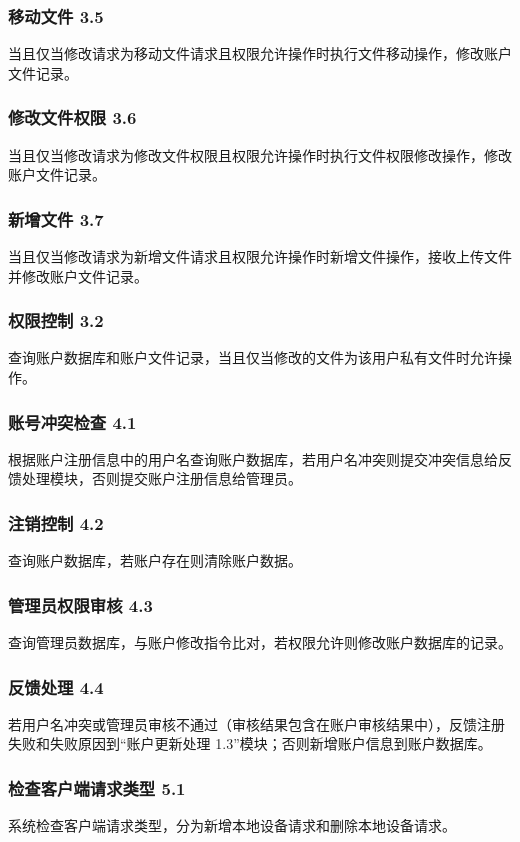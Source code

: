 \subsubsection{移动文件 3.5}
当且仅当修改请求为移动文件请求且权限允许操作时执行文件移动操作，修改账户文件记录。

\subsubsection{修改文件权限 3.6}
当且仅当修改请求为修改文件权限且权限允许操作时执行文件权限修改操作，修改账户文件记录。

\subsubsection{新增文件 3.7}
当且仅当修改请求为新增文件请求且权限允许操作时新增文件操作，接收上传文件并修改账户文件记录。

\subsubsection{权限控制 3.2}
查询账户数据库和账户文件记录，当且仅当修改的文件为该用户私有文件时允许操作。

\subsubsection{账号冲突检查 4.1}
根据账户注册信息中的用户名查询账户数据库，若用户名冲突则提交冲突信息给反馈处理模块，否则提交账户注册信息给管理员。

\subsubsection{注销控制 4.2}
查询账户数据库，若账户存在则清除账户数据。

\subsubsection{管理员权限审核 4.3}
查询管理员数据库，与账户修改指令比对，若权限允许则修改账户数据库的记录。

\subsubsection{反馈处理 4.4}
若用户名冲突或管理员审核不通过（审核结果包含在账户审核结果中），反馈注册失败和失败原因到“账户更新处理 1.3”模块；否则新增账户信息到账户数据库。

\subsubsection{检查客户端请求类型 5.1}
系统检查客户端请求类型，分为新增本地设备请求和删除本地设备请求。

